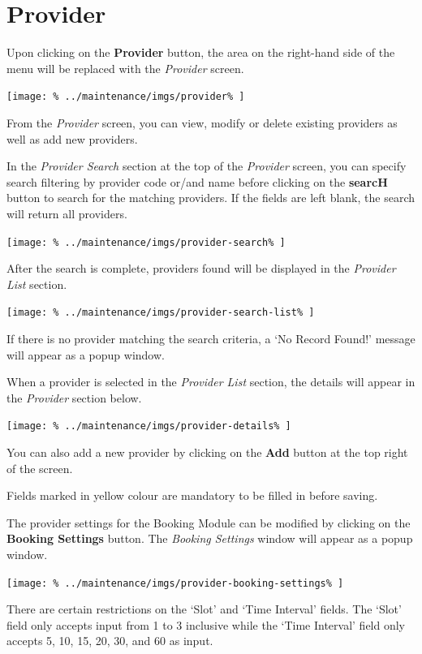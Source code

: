 \documentclass[../main/main]{subfiles}
\begin{document}
\newpage
\section{Provider}
\label{sec:provider}

Upon clicking on the \textbf{Provider} button,
the area on the right-hand side of the menu will be replaced with the
\emph{Provider} screen.

\texttt{[image: \%
  ../maintenance/imgs/provider\%
]}

From the \emph{Provider} screen, you can view, modify or delete existing
providers as well as add new providers.

In the \emph{Provider Search} section at the top of the \emph{Provider} screen,
you can specify search filtering by provider code or/and name before
clicking on the \textbf{searcH} button to search for the matching providers.
If the fields are left blank, the search will return all providers.

\texttt{[image: \%
  ../maintenance/imgs/provider-search\%
]}

After the search is complete, providers found will be displayed in the
\emph{Provider List} section.

\texttt{[image: \%
  ../maintenance/imgs/provider-search-list\%
]}

If there is no provider matching the search criteria, a `No Record Found!'
message will appear as a popup window.

\pagebreak
When a provider is selected in the \emph{Provider List} section, the details
will appear in the \emph{Provider} section below.

\texttt{[image: \%
  ../maintenance/imgs/provider-details\%
]}

You can also add a new provider by clicking on the \textbf{Add} button at the
top right of the screen.

Fields marked in yellow colour are mandatory to be filled in before saving.

The provider settings for the Booking Module can be modified by clicking on the
\textbf{Booking Settings} button. The \emph{Booking Settings} window will
appear as a popup window.

\texttt{[image: \%
  ../maintenance/imgs/provider-booking-settings\%
]}

There are certain restrictions on the `Slot' and `Time Interval' fields.
The `Slot' field only accepts input from 1 to 3 inclusive while the `Time
Interval' field only accepts 5, 10, 15, 20, 30, and 60 as input.
\end{document}
